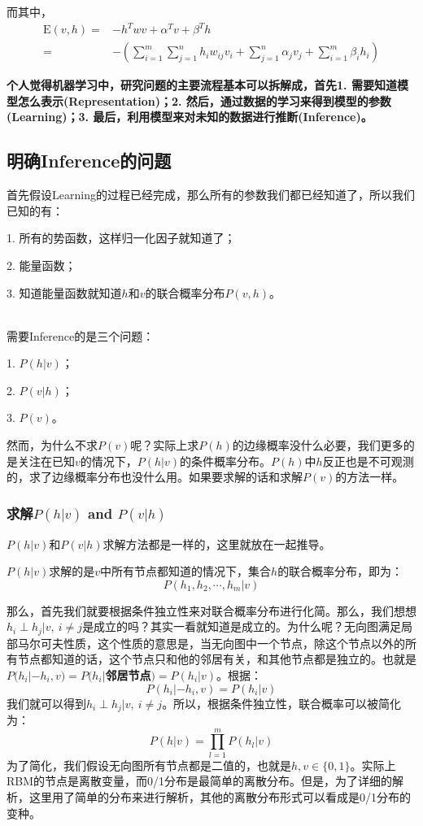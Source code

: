 \documentclass[a4paper]{article}
\begin{document}
而其中，
\begin{equation}
\begin{split}
    \mathrm{E}(v,h) = & - h^T w v + \alpha^T v + \beta^T h \\
    = & - \left( \sum_{i=1}^m \sum_{j=1}^n h_iw_{ij}v_i + \sum_{j=1}^n \alpha_j v_j + \sum_{i=1}^m \beta_i h_i 
    \right)
\end{split}
\end{equation}

\textbf{个人觉得机器学习中，研究问题的主要流程基本可以拆解成，首先1. 需要知道模型怎么表示(Representation)；2. 然后，通过数据的学习来得到模型的参数(Learning)；3. 最后，利用模型来对未知的数据进行推断(Inference)。}

\subsection{明确Inference的问题}
\noindent 首先假设Learning的过程已经完成，那么所有的参数我们都已经知道了，所以我们已知的有：
{\color{red}

1. 所有的势函数，这样归一化因子就知道了；

2. 能量函数；

3. 知道能量函数就知道$h$和$v$的联合概率分布$P(v,h)$。
}

~\\

\noindent 需要Inference的是三个问题：

1. $P(h|v)$；

2. $P(v|h)$；

3. $P(v)$。

然而，为什么不求$P(v)$呢？实际上求$P(h)$的边缘概率没什么必要，我们更多的是关注在已知$v$的情况下，$P(h|v)$的条件概率分布。$P(h)$中$h$反正也是不可观测的，求了边缘概率分布也没什么用。如果要求解的话和求解$P(v)$的方法一样。

\subsubsection{求解$P(h|v)$ and $P(v|h)$}
$P(h|v)$和$P(v|h)$求解方法都是一样的，这里就放在一起推导。

$P(h|v)$求解的是$v$中所有节点都知道的情况下，集合$h$的联合概率分布，即为：
$$
P(h_1,h_2,\cdots,h_m|v)
$$

那么，首先我们就要根据条件独立性来对联合概率分布进行化简。那么，我们想想$h_i\perp h_j|v,\ i\neq j$是成立的吗？其实一看就知道是成立的。为什么呢？无向图满足局部马尔可夫性质，这个性质的意思是，当无向图中一个节点，除这个节点以外的所有节点都知道的话，这个节点只和他的邻居有关，和其他节点都是独立的。也就是\textbf{{\color{red}$P(h_i|-h_i,v) = P(h_i|$邻居节点$)=P(h_i|v)$}}。根据：
$$
P(h_i|-h_i,v) =P(h_i|v)
$$
我们就可以得到$h_i\perp h_j|v,\ i\neq j$。所以，根据条件独立性，联合概率可以被简化为：
\begin{equation}
    P(h|v) = \prod_{l=1}^m P(h_l|v)
\end{equation}
为了简化，我们假设无向图所有节点都是二值的，也就是$h,v\in \{0,1 \}$。实际上RBM的节点是离散变量，而0/1分布是最简单的离散分布。但是，为了详细的解析，这里用了简单的分布来进行解析，其他的离散分布形式可以看成是0/1分布的变种。
\end{document}
